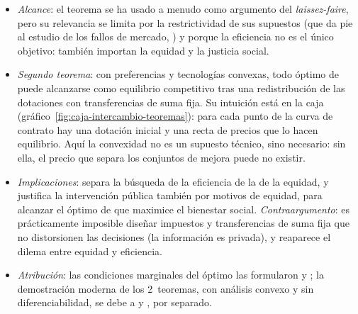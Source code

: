 \documentclass[11pt]{article}
\begin{document}
\begin{itemize}
\begin{enumerate}
  \item quien está mejor no podía pagar su nueva cesta, porque si hubiera podido la habría elegido: $\vect{p}^*\cdot\vect{x}'_i>\vect{p}^*\cdot\vect{\omega}_i$;
  \item quien está igual tampoco podía pagarla por menos: si $\vect{p}^*\cdot\vect{x}'_i<\vect{p}^*\cdot\vect{\omega}_i$, por la no saciedad local habría una cesta cercana, más barata que su renta y mejor que $\vect{x}'_i$, y por tanto mejor que $\vect{x}^*_i$, que no habría elegido. Así que $\vect{p}^*\cdot\vect{x}'_i\geq\vect{p}^*\cdot\vect{\omega}_i$;
  \item sumando para todos, $\vect{p}^*\cdot\sum_i\vect{x}'_i>\vect{p}^*\cdot\sum_i\vect{\omega}_i$, lo que contradice que $(\vect{x}'_i)$ sea factible: el equilibrio es óptimo de .\findemo
  \end{enumerate}
  La demostración no usa en ningún momento la convexidad, solo que los precios son comunes y que todos los bienes tienen precio.
\item \emph{Alcance}: el teorema se ha usado a menudo como argumento del \emph{laissez-faire}, pero su relevancia se limita por la restrictividad de sus supuestos (que da pie al estudio de los fallos de mercado, ) y porque la eficiencia no es el único objetivo: también importan la equidad y la justicia social.
\item \emph{Segundo teorema}: con preferencias y tecnologías convexas, todo óptimo de  puede alcanzarse como equilibrio competitivo tras una redistribución de las dotaciones con transferencias de suma fija. Su intuición está en la caja (gráfico~\ref{fig:caja-intercambio-teoremas}): para cada punto de la curva de contrato hay una dotación inicial y una recta de precios que lo hacen equilibrio. Aquí la convexidad no es un supuesto técnico, sino necesario: sin ella, el precio que separa los conjuntos de mejora puede no existir.
\item \emph{Implicaciones}: separa la búsqueda de la eficiencia de la de la equidad, y justifica la intervención pública también por motivos de equidad, para alcanzar el óptimo de  que maximice el bienestar social. \emph{Contraargumento}: es prácticamente imposible diseñar impuestos y transferencias de suma fija que no distorsionen las decisiones (la información es privada), y reaparece el dilema entre equidad y eficiencia.
\item \emph{Atribución}: las condiciones marginales del óptimo las formularon \textcite{Lerner1934Economic,Lerner1944Economics} y \textcite{Lange1942Foundations}; la demostración moderna de los 2~teoremas, con análisis convexo y sin diferenciabilidad, se debe a \textcite{Arrow1951Extension} y \textcite{Debreu1951Coefficient}, por separado.
\end{itemize}
\end{document}
